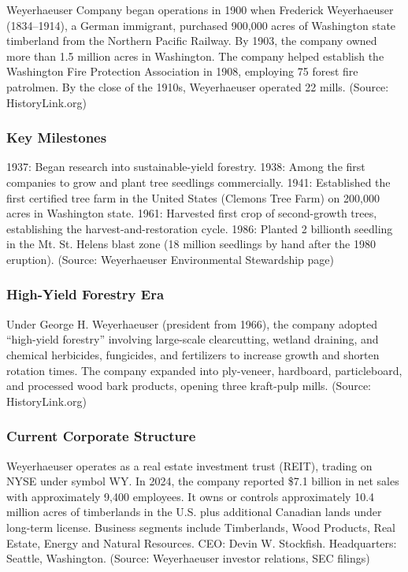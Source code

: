 \documentclass[11pt,letterpaper]{article}
\begin{document}
Weyerhaeuser Company began operations in 1900 when Frederick Weyerhaeuser (1834--1914), a German immigrant, purchased 900,000 acres of Washington state timberland from the Northern Pacific Railway. By 1903, the company owned more than 1.5 million acres in Washington. The company helped establish the Washington Fire Protection Association in 1908, employing 75 forest fire patrolmen. By the close of the 1910s, Weyerhaeuser operated 22 mills. (Source: HistoryLink.org)

\subsubsection{Key Milestones}

1937: Began research into sustainable-yield forestry. 1938: Among the first companies to grow and plant tree seedlings commercially. 1941: Established the first certified tree farm in the United States (Clemons Tree Farm) on 200,000 acres in Washington state. 1961: Harvested first crop of second-growth trees, establishing the harvest-and-restoration cycle. 1986: Planted 2 billionth seedling in the Mt. St. Helens blast zone (18 million seedlings by hand after the 1980 eruption). (Source: Weyerhaeuser Environmental Stewardship page)

\subsubsection{High-Yield Forestry Era}

Under George H. Weyerhaeuser (president from 1966), the company adopted ``high-yield forestry'' involving large-scale clearcutting, wetland draining, and chemical herbicides, fungicides, and fertilizers to increase growth and shorten rotation times. The company expanded into ply-veneer, hardboard, particleboard, and processed wood bark products, opening three kraft-pulp mills. (Source: HistoryLink.org)

\subsubsection{Current Corporate Structure}

Weyerhaeuser operates as a real estate investment trust (REIT), trading on NYSE under symbol WY. In 2024, the company reported \$7.1 billion in net sales with approximately 9,400 employees. It owns or controls approximately 10.4 million acres of timberlands in the U.S. plus additional Canadian lands under long-term license. Business segments include Timberlands, Wood Products, Real Estate, Energy and Natural Resources. CEO: Devin W. Stockfish. Headquarters: Seattle, Washington. (Source: Weyerhaeuser investor relations, SEC filings)
\end{document}
